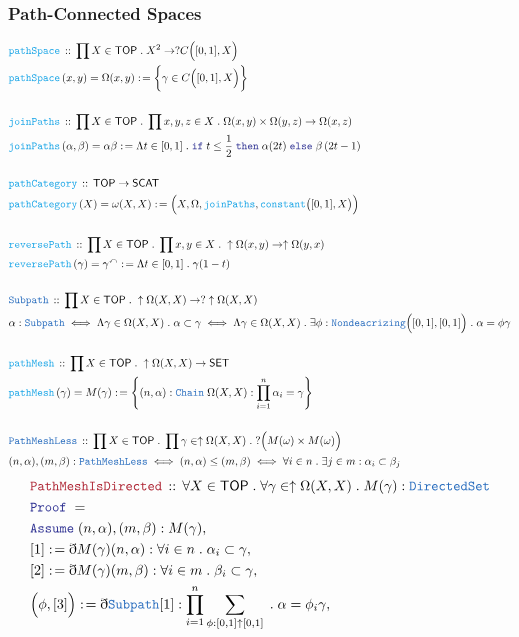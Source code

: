 \documentclass[12pt]{scrartcl}
\newcommand{\TYPE}[1]{\textcolor{NavyBlue}{\mathtt{#1}}}
\newcommand{\FUNC}[1]{\textcolor{Cerulean}{\mathtt{#1}}}
\newcommand{\LOGIC}[1]{\textcolor{Blue}{\mathtt{#1}}}
\newcommand{\THM}[1]{\textcolor{Maroon}{\mathtt{#1}}}
\renewcommand{\.}{\; . \;}
\newcommand{\de}{: \kern 0.1pc =}
\newcommand{\If}{\LOGIC{if} \;}
\newcommand{\Then}{ \; \LOGIC{then} \;}
\newcommand{\Else}{\; \LOGIC{else} \;}
\newcommand{\Act}[1]{\left( #1 \right)}
\newcommand{\Theorem}[2]{& \THM{#1} \, :: \, #2 \\ & \Proof = \\ }
\newcommand{\DeclareType}[2]{& \TYPE{#1} \, :: \, #2 \\}
\newcommand{\DefineNamedType}[4]{& #1 : \TYPE{#2} \iff #3 \iff #4 \\}
\newcommand{\DeclareFunc}[2]{& \FUNC{#1} \, :: \, #2 \\}
\newcommand{\DefineNamedFunc}[4]{&  \FUNC{#1}\Act{#2} = #3 \de #4 \\}
\newcommand{\Page}[1]{ \begin{align*} #1 \end{align*}   }
\newcommand{ \bd }{ \ByDef }
\newcommand{\Say}[3]{& #1 \de #2 : #3, \\}
\newcommand{\Assume}[2]{& \LOGIC{Assume} \; #1 : #2, \\}
\newcommand{\ByDef}{\eth}
\newcommand{\Proof}{\LOGIC{Proof} \; }
\newcommand{\SET}{\mathsf{SET}}
\newcommand{\TOP}{\mathsf{TOP}}
\begin{document}
\subsubsection{Path-Connected Spaces}
\Page{
	\DeclareFunc{pathSpace}{\prod X \in \TOP \.  X^2 \to ?C\Big([0,1],X\Big)}
	\DefineNamedFunc{pathSpace}{x,y}
	{\Omega(x,y)}{\bigg\{ \gamma \in C\Big([0,1], X \Big)  \bigg\}}
	\\
	\DeclareFunc{joinPaths}
	{\prod  X \in \TOP \. \prod x,y,z \in X \. \Omega(x,y)\times \Omega(y,z) \to \Omega(x,z)}
	\DefineNamedFunc{joinPaths}{\alpha, \beta}{\alpha \beta}
	{\Lambda t \in [0,1] \. \If t \le \frac{1}{2} \Then \alpha(2t) 
		\Else  \beta\left(  2t -  1 \right)}
	\\
	\DeclareFunc{pathCategory}{\TOP \to \mathsf{SCAT}}
	\DefineNamedFunc{pathCategory}{X}{ \omega(X,X) }
	{ \Big(  X, \Omega, \FUNC{joinPaths}, \FUNC{constant}\big([0,1], X\big)   \Big)}            
	\\
	\DeclareFunc{reversePath}
	{\prod X \in \TOP \. \prod x,y \in X \. \uparrow\Omega(x,y) \to \uparrow\Omega(y,x) }
	\DefineNamedFunc{reversePath}{\gamma}
	{\gamma^\curvearrowleft}{\Lambda t \in [0,1] \. \gamma(1 - t)}
	\\
	\DeclareType{Subpath}{\prod X \in \TOP \. \uparrow \Omega(X,X) \to ?\uparrow\Omega(X,X)}
	\DefineNamedType{\alpha}{Subpath}
	{\Lambda \gamma \in \Omega(X,X) \. \alpha \subset \gamma }
	{
		\Lambda \gamma \in \Omega(X,X) \. 
		\exists \phi : \TYPE{Nondeacrizing}\Big([0,1],[0,1]\Big) \.
		\alpha = \phi\gamma
	}
	\\
	\DeclareFunc{pathMesh}{ \prod X \in \TOP \.\uparrow \Omega(X,X) \to \SET}
	\DefineNamedFunc{pathMesh}{\gamma}
	{M(\gamma)  }{  \left\{ (n,\alpha) : \TYPE{Chain}\; \Omega(X,X)  : 
		\prod^n_{i=1} \alpha_i = \gamma  \right\}}	
	\\
	\DeclareType{PathMeshLess}{\prod X \in \TOP \. \prod \gamma \in \uparrow \Omega(X,X) \.
		?\Big( M(\omega) \times M(\omega) \Big)}
	\DefineNamedType{(n,\alpha),(m,\beta)}{PathMeshLess}
	{ (n,\alpha) \le (m,\beta)}{\forall i \in n \. \exists j \in m : \alpha_i \subset \beta_j }
}\Page{
	\Theorem{PathMeshIsDirected}{\forall X \in \TOP \. \forall \gamma \in \uparrow \Omega(X,X)
	\. M(\gamma) : \TYPE{DirectedSet}}
	\Assume{(n,\alpha),(m,\beta)}{M(\gamma)}
	\Say{[1]}{\bd M(\gamma)(n,\alpha)}{ \forall i \in n \. \alpha_i \subset \gamma}
	\Say{[2]}{\bd M(\gamma)(m,\beta)}{ \forall i \in m \. \beta_i \subset \gamma}
	\Say{\Big(\phi,[3]\Big)}{\bd \TYPE{Subpath}[1]}
	{ \prod^n_{i=1} \sum_{\phi : [0,1]\uparrow [0,1]} \. \alpha = \phi_i \gamma }  
}
\end{document}
